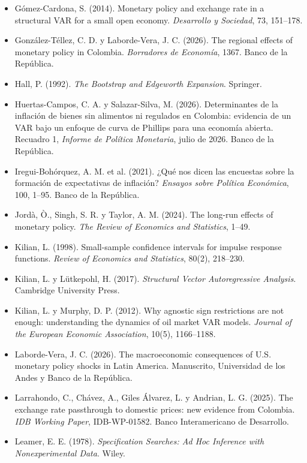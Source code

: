 \documentclass[12pt,letterpaper]{article}
\begin{document}
\begin{itemize}[label={}, leftmargin=1.5em, itemindent=-1.5em]
\item G\'omez-Cardona, S. (2014). Monetary policy and exchange rate in a structural VAR for a small open economy. \textit{Desarrollo y Sociedad}, 73, 151--178.
\item Gonz\'alez-T\'ellez, C. D. y Laborde-Vera, J. C. (2026). The regional effects of monetary policy in Colombia. \textit{Borradores de Econom\'ia}, 1367. Banco de la Rep\'ublica.
\item Hall, P. (1992). \textit{The Bootstrap and Edgeworth Expansion}. Springer.
\item Huertas-Campos, C. A. y Salazar-Silva, M. (2026). Determinantes de la inflaci\'on de bienes sin alimentos ni regulados en Colombia: evidencia de un VAR bajo un enfoque de curva de Phillips para una econom\'ia abierta. Recuadro 1, \textit{Informe de Pol\'itica Monetaria}, julio de 2026. Banco de la Rep\'ublica.
\item Iregui-Boh\'orquez, A. M. et al. (2021). ¿Qu\'e nos dicen las encuestas sobre la formaci\'on de expectativas de inflaci\'on? \textit{Ensayos sobre Pol\'itica Econ\'omica}, 100, 1--95. Banco de la Rep\'ublica.
\item Jord\`a, \`O., Singh, S. R. y Taylor, A. M. (2024). The long-run effects of monetary policy. \textit{The Review of Economics and Statistics}, 1--49.
\item Kilian, L. (1998). Small-sample confidence intervals for impulse response functions. \textit{Review of Economics and Statistics}, 80(2), 218--230.
\item Kilian, L. y L\"utkepohl, H. (2017). \textit{Structural Vector Autoregressive Analysis}. Cambridge University Press.
\item Kilian, L. y Murphy, D. P. (2012). Why agnostic sign restrictions are not enough: understanding the dynamics of oil market VAR models. \textit{Journal of the European Economic Association}, 10(5), 1166--1188.
\item Laborde-Vera, J. C. (2026). The macroeconomic consequences of U.S. monetary policy shocks in Latin America. Manuscrito, Universidad de los Andes y Banco de la Rep\'ublica.
\item Larrahondo, C., Ch\'avez, A., Giles \'Alvarez, L. y Andrian, L. G. (2025). The exchange rate passthrough to domestic prices: new evidence from Colombia. \textit{IDB Working Paper}, IDB-WP-01582. Banco Interamericano de Desarrollo.
\item Leamer, E. E. (1978). \textit{Specification Searches: Ad Hoc Inference with Nonexperimental Data}. Wiley.

\end{itemize}
\end{document}
